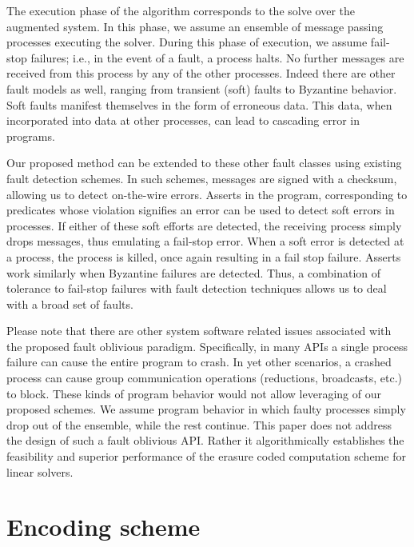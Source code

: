 \documentclass[11pt]{article}
\begin{document}
The execution phase of the algorithm corresponds to the solve over the augmented system.
In this phase, we assume an ensemble of message passing processes executing the solver.
During this phase of execution, we assume fail-stop failures; i.e., in the event of a
fault, a process halts. No further messages are received from this process by
any of the other processes. Indeed there are other fault models as well, ranging from
transient (soft) faults to Byzantine behavior. Soft faults manifest themselves
in the form of erroneous data. This data, when incorporated into data at other
processes, can lead to cascading error in programs.

Our proposed method can be extended to these other fault classes using existing
fault detection schemes. In such schemes, messages are signed with a checksum,
allowing us to detect on-the-wire errors. Asserts in the program, corresponding to
predicates whose violation signifies an error can be used to detect soft errors in
processes. If either of these soft efforts are detected, the receiving process
simply drops messages, thus emulating a fail-stop error. When a soft error is detected
at a process, the process is killed, once again resulting in a fail stop failure. Asserts
work similarly when Byzantine failures are detected. Thus, a combination of tolerance
to fail-stop failures with fault detection techniques allows us to deal with
a broad set of faults.

Please note that there are other system software related issues
associated with the proposed fault oblivious paradigm. Specifically, in many APIs a
single process failure can cause the entire program to crash. In yet
other scenarios, a crashed process can cause group communication operations
(reductions, broadcasts, etc.) to block. These kinds of program behavior would not allow
leveraging of our proposed schemes. We assume program behavior
in which faulty processes simply drop out of the ensemble, while the rest continue.
This paper does not address the design of such a fault oblivious API. Rather
it algorithmically establishes the feasibility and superior performance of
the erasure coded computation scheme for linear solvers.


\section{Encoding scheme} \label{sec:encoding}
\end{document}
